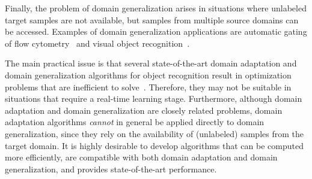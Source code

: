 \documentclass[10pt,journal,compsoc]{IEEEtran}
\begin{document}
Finally, the problem of domain generalization arises in situations where unlabeled target samples are not available, but samples from multiple source domains can be accessed.
Examples of domain generalization applications are automatic gating of flow cytometry~\cite{Blanchard2011,Muandet2013} and visual object recognition~\cite{Fang2013,Khosla2012,Xu2014}.

The main practical issue is that several state-of-the-art domain adaptation and domain generalization algorithms for object recognition result in optimization problems that are inefficient to solve~\cite{Long:2013aa,Long2014a,Shekhar:2013,Xu2014}.
Therefore, they may not be suitable in situations that require a real-time learning stage.
Furthermore, although domain adaptation and domain generalization are closely related problems, domain adaptation algorithms \emph{cannot} in general be applied directly to domain generalization, since they rely on the availability of (unlabeled) samples from the target domain.
It is highly desirable to develop algorithms that can be computed more efficiently, are compatible with both domain adaptation and domain generalization, and provides state-of-the-art performance.

\vspace{-1em}
\end{document}
